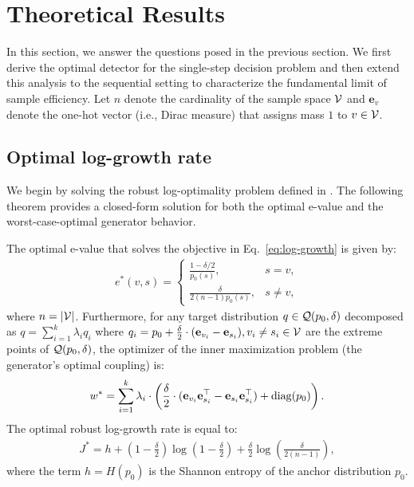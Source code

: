\section{Theoretical Results}

In this section, we answer the questions posed in the previous section. We first derive the optimal detector for the single-step decision problem and then extend this analysis to the sequential setting to characterize the fundamental limit of sample efficiency. Let $n$ denote the cardinality of the sample space $\mathcal{V}$ and $\mathbf{e}_v$ denote the one-hot vector (i.e., Dirac measure) that assigns mass $1$ to $v \in \mathcal{V}$.

\subsection{Optimal log-growth rate}

We begin by solving the robust log-optimality problem defined in . The following theorem provides a closed-form solution for both the optimal e-value and the worst-case-optimal generator behavior.

\begin{theorem}\label{thm:log-growth}
The optimal e-value that solves the objective in Eq.~\eqref{eq:log-growth} is given by:
\begin{align}\label{eq:optimal-e}
e^*(v,s)
=
\begin{cases}
\frac{1-\delta/2}{p_0(s)}, & s=v,\\
\frac{\delta}{2(n-1)p_0(s)}, & s\neq v,
\end{cases}
\end{align}
where $n = |\mathcal{V}|$. Furthermore, for any target distribution $q \in \mathcal{Q}(p_0,\delta)$ decomposed as $q = \sum_{i=1}^k \lambda_i q_i$ where $q_i = p_0 + \frac{\delta}{2}\cdot (\mathbf{e}_{v_i} - \mathbf{e}_{s_i}), v_i \neq s_i \in \mathcal{V}$ are the extreme points of $\mathcal{Q}(p_0,\delta)$, 
the optimizer of the inner maximization problem (the generator's optimal coupling) is:
\begin{align}\label{eq:coupling}
    w^* = \sum_{i=1}^k \lambda_i \cdot \left(\frac{\delta}{2} \cdot (\mathbf{e}_{v_i}\mathbf{e}_{s_i}^\top - \mathbf{e}_{s_i}\mathbf{e}_{s_i}^\top) + \mathrm{diag}(p_0)\right).
\end{align}
The optimal robust log-growth rate is equal to:
\begin{align}\label{eq:optimal-log-growth}
    J^* = h + \left(1-\frac{\delta}{2}\right)\log\left(1-\frac{\delta}{2}\right)
 + \frac{\delta}{2}\log\left(\frac{\delta}{2(n-1)}\right),
\end{align}
where the term $h = H(p_0)$ is the Shannon entropy of the anchor distribution $p_0$.
\end{theorem}

